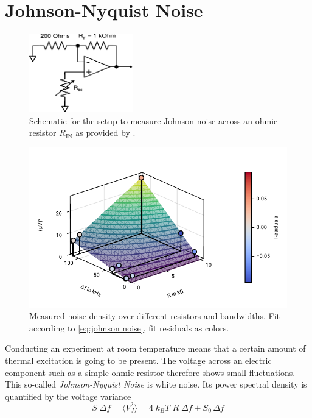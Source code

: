 \documentclass[
    parskip=half, 
    twoside=false,
    twocolumn=true,
    fontsize=11pt,
]{scrarticle}
\begin{document}
\section{Johnson-Nyquist Noise}
\begin{figure}
    \centering
    \includegraphics[width=0.4\textwidth]{figures/measure_R_setup_part1.pdf}
    \caption{
        Schematic for the setup to measure Johnson noise across an ohmic resistor $R_\text{IN}$ as provided by \autocite{instructions}.
    }
    \label{fig:johnson setup R}
\end{figure}
\begin{figure}[h!]
    \centering
    \includegraphics{figures/05 johnson noise rt plane.pdf}
    \caption{
        Measured noise density over different resistors and bandwidths.
        Fit according to \autoref{eq:johnson noise}, fit residuals as colors.
    }
    \label{fig:johnson noise}
\end{figure}
Conducting an experiment at room temperature means that a certain amount of thermal excitation is going to be present. The voltage across an electric component such as a simple ohmic resistor therefore shows small fluctuations. This so-called \textit{Johnson-Nyquist Noise} is white noise. Its power spectral density is quantified by the voltage variance
\begin{equation}
    \label{eq:johnson noise}
    S\;\Delta f = \langle V_J^2 \rangle = 4\; k_B T\; R\; \Delta f + S_0\, \Delta f
\end{equation} 
\end{document}
